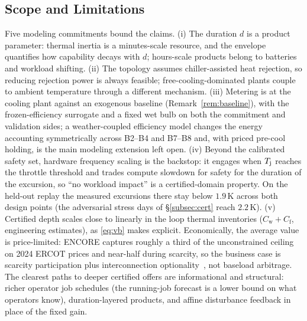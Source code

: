 \vspace{-3mm}
\subsection{Scope and Limitations}
\label{subsec:limits}

Five modeling commitments bound the claims. (i) The duration $d$ is a
product parameter: thermal inertia is a minutes-scale resource, and the
envelope quantifies how capability decays with $d$; hours-scale products
belong to batteries and workload shifting. (ii) The topology assumes
chiller-assisted heat rejection, so reducing rejection power is always
feasible; free-cooling-dominated plants couple to ambient temperature
through a different mechanism. (iii) Metering is at the cooling plant
against an exogenous baseline (Remark~\ref{rem:baseline}), with the
frozen-efficiency surrogate and a fixed wet bulb on both the commitment and
validation sides; a weather-coupled efficiency model changes the energy
accounting symmetrically across B2--B4 and B7--B8 and, with priced pre-cool holding,
is the main modeling extension left open. (iv) Beyond the calibrated safety
set, hardware frequency scaling is the backstop: it engages when $\Tj$
reaches the throttle threshold and trades compute slowdown for safety for
the duration of the excursion, so ``no workload impact'' is a
certified-domain property. On the held-out replay the measured excursions
there stay below $1.9$\,K across both design points (the adversarial stress
days of \S\ref{subsec:cert} reach $2.2$\,K). (v) Certified depth
scales close to linearly in the loop thermal inventories
($C_\mathrm{w}{+}C_\mathrm{f}$, engineering estimates), as \eqref{eq:vb}
makes explicit.
Economically, the average value is price-limited: ENCORE captures roughly a
third of the unconstrained ceiling on 2024 ERCOT prices and near-half during
scarcity, so the business case is scarcity participation plus
interconnection optionality~\cite{norris2025rethinking,sb6_2025}, not
baseload arbitrage. The clearest paths to deeper certified offers are
informational and structural: richer operator job schedules (the running-job
forecast is a lower bound on what operators know), duration-layered products,
and affine disturbance feedback in place of the fixed gain.

\vspace{-2mm}